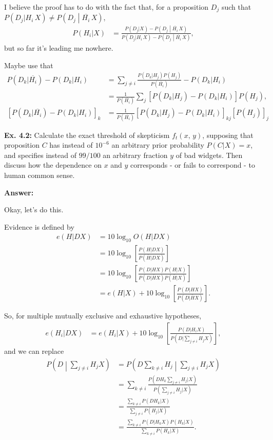 \documentclass{article}
\begin{document}
I believe the proof has to do with the fact that, for a proposition $D_j$ such that $P(D_j|H_i\,X)\neq P\left(D_j\middle|\overline{H_i}\,X\right)$,
\begin{align*}
	P(H_i|X)&=\frac{P(D_j|X)-P\left(D_j\middle|\overline{H_i}\,X\right)}{P(D_j|H_i\,X)-P\left(D_j\middle|\overline{H_i}\,X\right)},
\end{align*}
but so far it's leading me nowhere.

Maybe use that
\begin{align*}
	P(D_k|\overline{H_i})-P(D_k|H_i)&=\sum_{j\neq i}\frac{P(D_k|H_j)P(H_j)}{P(\overline{H_i})}-P(D_k|H_i)\\
	&=\frac1{P(\overline{H_i})}\sum_j\left[P(D_k|H_j)-P(D_k|H_i)\right]P(H_j),\\
	\left[P(D_k|\overline{H_i})-P(D_k|H_i)\right]_k&=\frac1{P(\overline{H_i})}\left[P(D_k|H_j)-P(D_k|H_i)\right]_{kj}\left[P(H_j)\right]_j
\end{align*}


\textbf{Ex. 4.2: }Calculate the exact threshold of skepticism $f_t(x,\,y)$, supposing that proposition $C$ has instead of $10^{-6}$ an arbitrary prior probability $P(C|X)=x$, and specifies instead of $99/100$ an arbitrary fraction $y$ of bad widgets. Then discuss how the dependence on $x$ and $y$ corresponds - or fails to correspond - to human common sense.

\textbf{Answer:}

Okay, let's do this.

Evidence is defined by
\begin{align*}
	e(H|DX)&=10\log_{10}O(H|DX)\\
	&=10\log_{10}\left[\frac{P(H|DX)}{P(\overline{H}|DX)}\right]\\
	&=10\log_{10}\left[\frac{P(D|HX)P(H|X)}{P(D|\overline{H}X)P(\overline{H}|X)}\right]\\
	&=e(H|X)+10\log_{10}\left[\frac{P(D|HX)}{P(D|\overline{H}X)}\right].
\end{align*}

So, for multiple mutually exclusive and exhaustive hypotheses,
\begin{align*}
	e(H_i|DX)&=e(H_i|X)+10\log_{10}\left[\frac{P(D|H_iX)}{P(D|\sum_{j\neq i}H_jX)}\right],
\end{align*}
and we can replace
\begin{align}
	P\left(D\middle|\sum_{j\neq i}H_jX\right)&=P\left(D\sum_{k\neq i}H_j\middle|\sum_{j\neq i}H_jX\right)\\
	&=\sum_{k\neq i}\frac{P(DH_k\sum_{j\neq i}H_j|X)}{P(\sum_{j\neq i}H_j|X)}\\
	&=\frac{\sum_{k\neq i}P(DH_k|X)}{\sum_{j\neq i}P(H_j|X)}\\
	&=\frac{\sum_{k\neq i}P(D|H_kX)P(H_k|X)}{\sum_{k\neq i}P(H_k|X)}.
\end{align}
\end{document}
